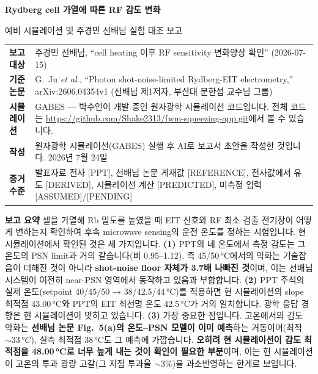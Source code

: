 \documentclass[10pt,a4paper]{article}
\newcommand{\Status}[1]{\textsf{\footnotesize[#1]}}
\newcommand{\summarybox}[1]{%
  \noindent\colorbox{pale}{%
    \parbox{\dimexpr\textwidth-2\fboxsep\relax}{#1}}}
\providecommand{\SlopeOptimumTemperatureC}{43.00}
\providecommand{\SensitivityOptimumTemperatureC}{48.00}
\providecommand{\GabesOptimumTransmissionPct}{3}
\providecommand{\PaperPSNOptimumC}{33}
\providecommand{\ExperimentBestC}{38}
\begin{document}
{\color{navy}\LARGE\bfseries Rydberg cell 가열에 따른 RF 감도 변화\par}
\vspace{2pt}
{\large 예비 시뮬레이션 및 주경민 선배님 실험 대조 보고}

\vspace{0.5em}
\begin{tabularx}{\textwidth}{>{\bfseries}p{2.7cm}X}
보고 대상 & 주경민 선배님, ``cell heating 이후 RF sensitivity 변화양상 확인'' (2026-07-15)\\
기준 논문 & G.\ Ju \textit{et al.}, ``Photon shot-noise-limited Rydberg-EIT electrometry,''
           arXiv:2606.04354v1 (선배님 제1저자, 부산대 문한섭 교수님 그룹)\\
시뮬레이션 & GABES --- 박수인이 개발 중인 원자광학 시뮬레이션 코드입니다.
             전체 코드는 \url{https://github.com/Shake2313/fwm-squeezing-app.git}에서 볼 수 있습니다.\\
작성 & 원자광학 시뮬레이션(GABES) 실행 후 AI로 보고서 초안을 작성한 것입니다. 2026년 7월 24일\\
증거 수준 & 발표자료 전사 \Status{PPT}, 선배님 논문 게재값 \Status{REFERENCE},
            전사값에서 유도 \Status{DERIVED}, 시뮬레이션 계산 \Status{PREDICTED},
            미측정 입력 \Status{ASSUMED}/\Status{PENDING}\\
\end{tabularx}

\vspace{0.4em}
\summarybox{%
\textbf{\color{navy}보고 요약}\quad
셀을 가열해 Rb 밀도를 높였을 때 EIT 신호와 RF 최소 검출 전기장이 어떻게 변하는지 확인하여
후속 microwave sensing의 운전 온도를 정하는 시험입니다. 현 시뮬레이션에서 확인된 것은 세 가지입니다.
\textbf{(1)} PPT의 네 온도에서 측정 감도는 그 온도의 PSN limit과 거의 같습니다(비 0.95--1.12).
즉 45/50\,°C에서의 악화는 기술잡음이 더해진 것이 아니라 \textbf{shot-noise floor 자체가 3.7배
나빠진 것}이며, 이는 선배님 시스템이 여전히 near-PSN 영역에서 동작하고 있음과 부합합니다.
\textbf{(2)} PPT 주석의 실제 온도(setpoint 40/45/50 → 38/42.5/44\,°C)를 적용하면
현 시뮬레이션의 slope 최적점 \SlopeOptimumTemperatureC\,°C와 PPT의 EIT 최선명 온도 42.5\,°C가 거의
일치합니다. 광학 응답 경향은 현 시뮬레이션이 맞히고 있습니다.
\textbf{(3)} 가장 중요한 점입니다. 고온에서의 감도 악화는 \textbf{선배님 논문 Fig.\ 5(a)의
온도--PSN 모델이 이미 예측}하는 거동이며(최적 \(\sim\PaperPSNOptimumC\,°C\)), 실측 최적점
\ExperimentBestC\,°C도 그 예측에 가깝습니다. \textbf{오히려 현 시뮬레이션이 감도 최적점을
\SensitivityOptimumTemperatureC\,°C로 너무 높게 내는 것이 확인이 필요한 부분}이며,
이는 현 시뮬레이션이 고온의 투과 광량 고갈(그 지점 투과율 \(\sim\GabesOptimumTransmissionPct\%\))을
과소반영하는 한계로 보입니다.}
\end{document}

